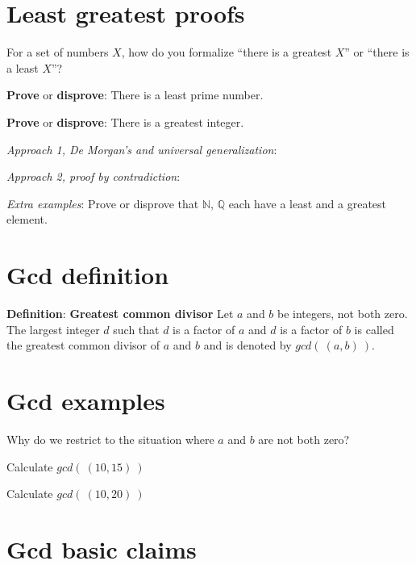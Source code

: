 \documentclass[12pt, oneside]{article}
\begin{document}
 \vfill
\section*{Least greatest proofs}


For a set of numbers $X$, how do you formalize ``there is a greatest $X$'' 
or ``there is a least $X$''?

\vspace{30pt}

{\bf Prove} or {\bf  disprove}:  There is a least prime number.

\vspace{100pt}

{\bf Prove} or {\bf  disprove}: There is a greatest integer. 

{\it Approach 1, De Morgan's and universal generalization}: 

\vspace{100pt}

{\it Approach 2, proof by contradiction}: 

\vspace{200pt}

{\it Extra examples}: 
Prove or disprove that $\mathbb{N}$,  $\mathbb{Q}$ each have a
least and a greatest element. 
 \vfill
\section*{Gcd definition}


{\bf Definition}: {\bf Greatest common divisor} Let $a$ and $b$ be integers, not both zero. The largest integer $d$ such that 
$d$ is a  factor of $a$ and $d$ is a factor of  $b$ is called the greatest common divisor of $a$ and $b$ 
and is denoted by $gcd(~(a, b)~)$. \vfill
\section*{Gcd examples}


Why do we restrict to the situation where $a$ and $b$ are not both zero?

\vspace{50pt}


Calculate $gcd(~(10,15)~)$

\vspace{50pt}

Calculate $gcd(~(10,20)~)$

\vspace{50pt} \vfill
\section*{Gcd basic claims}
\end{document}
